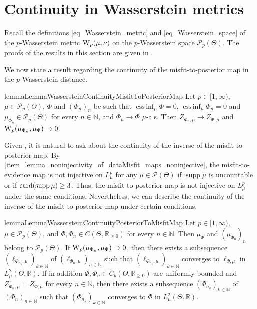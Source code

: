 \documentclass[a4paper]{scrartcl}
\theoremstyle{definition}
\numberwithin{equation}{section}
\newcommand{\R}{\mathbb{R}}
\newcommand{\N}{\mathbb{N}}
\newcommand{\card}[1]{\textup{card}({#1})}
\DeclareMathOperator{\supp}{supp}
\DeclareMathOperator*{\essinf}{ess\,inf}
\newcommand{\Was}[0]{\textup{W}}
\begin{document}
\section{Continuity in Wasserstein metrics}
\label{section_continuity_in_Wp_metrics}

Recall the definitions \eqref{eq_Wasserstein_metric} and \eqref{eq_Wasserstein_space} of the $p$-Wasserstein metric $\Was_p(\mu,\nu)$ on the $p$-Wasserstein space $\mathcal{P}_p(\Theta)$.
The proofs of the results in this section are given in .

We now state a result regarding the continuity of the misfit-to-posterior map in the $p$-Wasserstein distance.
\begin{restatable}{lemma}{LemmaWassersteinContinuityMisfitToPosteriorMap}
\label{lemma_Wasserstein_continuity_misfit_to_posterior_map}
Let $p\in[1,\infty)$, $\mu \in \mathcal{P}_p (\Theta)$, $\Phi$ and $(\Phi_n)_n$ be such that $\essinf_\mu\Phi=0$, $\essinf_\mu\Phi_n=0$ and $\mu_{\Phi_n}\in\mathcal{P}_p(\Theta)$ for every $n\in\N$, and $\Phi_n\to \Phi$ $\mu$-a.s. Then $Z_{\Phi_n,\mu}\to Z_{\Phi,\mu}$ and $\Was_p(\mu_{\Phi_n},\mu_{\Phi})\to 0$.
\end{restatable}

Given , it is natural to ask about the continuity of the inverse of the misfit-to-posterior map.
By \ref{item_lemma_noninjectivity_of_dataMisfit_maps_noninjective}, the misfit-to-evidence map is not injective on $L^p_\mu$ for any $\mu\in\mathcal{P}(\Theta)$ if $\supp{\mu}$ is uncountable or if $\card{\supp{\mu}}\geq 3$.
Thus, the misfit-to-posterior map is not injective on $L^p_\mu$ under the same conditions.
Nevertheless, we can describe the continuity of the inverse of the misfit-to-posterior map under certain conditions.
\begin{restatable}{lemma}{LemmaWassersteinContinuityPosteriorToMisfitMap}
 \label{lemma_Wasserstein_continuity_posterior_to_misfit_map}
 Let $p\in[1,\infty)$, $\mu\in\mathcal{P}_p(\Theta)$, and $\Phi,\Phi_n\in C(\Theta,\R_{\geq 0})$ for every $n\in\N$. Then $\mu_\Phi$ and $(\mu_{\Phi_n})_n$ belong to $\mathcal{P}_p(\Theta)$. If $\Was_p(\mu_{\Phi_n},\mu_\Phi)\to 0$, then there exists a subsequence $(\ell_{\Phi_{n_k},\mu})_{k\in\N}$ of $(\ell_{\Phi_n,\mu})_{n\in\N}$ such that $(\ell_{\Phi_{n_k},\mu})_{k\in\N}$ converges to $\ell_{\Phi,\mu}$ in $L^2_\mu(\Theta,\R)$.
 If in addition $\Phi,\Phi_n\in C_b(\Theta,\R_{\geq 0})$ are uniformly bounded and $Z_{\Phi_n,\mu}=Z_{\Phi,\mu}$ for every $n\in\N$, then there exists a subsequence $(\Phi_{n_k})_{k\in\N}$ of $(\Phi_n)_{n\in\N}$ such that $(\Phi_{n_k})_{k\in\N}$ converges to $\Phi$ in $L^2_\mu(\Theta,\R)$.
\end{restatable}
\end{document}
